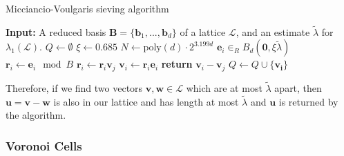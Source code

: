 \documentclass[a4paper, 10pt]{article}
\theoremstyle{definition}
\begin{document}
\begin{algorithm}[H]
    \caption{Micciancio-Voulgaris sieving algorithm \cite{inproceedings}}
    \begin{algorithmic}[1]
    \State \textbf{Input:} A reduced basis $\mathbf{B}=\{\mathbf{b}_1,...,\mathbf{b}_d\}$ of a lattice $\mathcal{L}$, and an estimate $\tilde{\lambda}$ for $\lambda_1(\mathcal{L})$.
    \State $Q \gets \emptyset$
    \State $\xi \gets 0.685$
    \State $N \gets \mbox{poly}(d)\cdot 2^{3.199d}$
        \State $\mathbf{e}_i \in _R B_d(\mathbf{0}, \xi \tilde{\lambda})$
        \State $\mathbf{r}_i \gets \mathbf{e}_i \mod{B}$
            \State $\mathbf{r}_i \gets \mathbf{r}_i \mathbf{v}_j$
        \EndWhile
        \State $\mathbf{v}_i \gets \mathbf{r}_i \mathbf{e}_i$
                \State \textbf{return} $\mathbf{v}_i - \mathbf{v}_j$
            \EndIf
            \State $Q \gets Q \cup \{\mathbf{v_i}\}$
        \EndIf
    \EndFor
    \end{algorithmic}
\end{algorithm}
Therefore, if we find two vectors $\mathbf{v,w}\in\mathcal{L}$ which are at most $\tilde{\lambda}$ apart, then $\mathbf{u} = \mathbf{v} - \mathbf{w}$ is also in our lattice and has length at most $\tilde{\lambda}$ and $\mathbf{u}$ is returned by the algorithm.

\subsubsection{Voronoi Cells}
\end{document}
